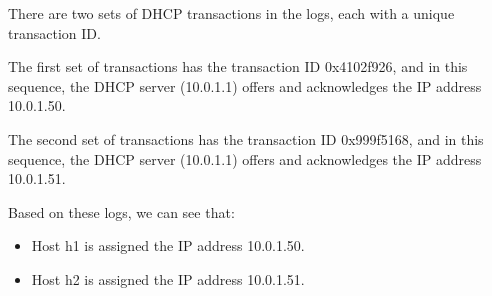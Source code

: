There are two sets of DHCP transactions in the logs, each with a unique transaction ID.

The first set of transactions has the transaction ID 0x4102f926, and in this sequence, the DHCP server (10.0.1.1) offers and acknowledges the IP address 10.0.1.50.

The second set of transactions has the transaction ID 0x999f5168, and in this sequence, the DHCP server (10.0.1.1) offers and acknowledges the IP address 10.0.1.51.

Based on these logs, we can see that:
\begin{itemize}
    \item Host h1 is assigned the IP address 10.0.1.50.
    \item Host h2 is assigned the IP address 10.0.1.51.
\end{itemize}